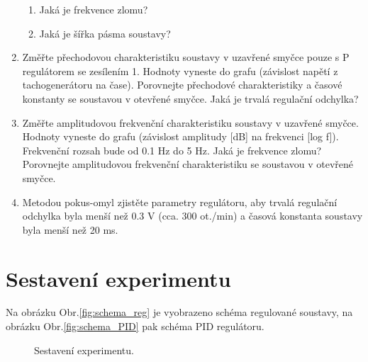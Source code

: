 \begin{enumerate}
\begin{enumerate}
	\item Jaká je frekvence zlomu?
	\item Jaká je šířka pásma soustavy?
\end{enumerate}
\item Změřte přechodovou charakteristiku soustavy v uzavřené smyčce pouze s P regulátorem se zesílením 1. Hodnoty vyneste do grafu (závislost napětí z tachogenerátoru na čase). Porovnejte přechodové charakteristiky a časové konstanty se soustavou v otevřené smyčce. Jaká je trvalá regulační odchylka?
\item Změřte amplitudovou frekvenční charakteristiku soustavy v uzavřené smyčce. Hodnoty vyneste do grafu (závislost amplitudy [dB] na frekvenci [log f]). Frekvenční rozsah bude od 0.1 Hz do 5 Hz. Jaká je frekvence zlomu? Porovnejte amplitudovou frekvenční charakteristiku se soustavou v otevřené smyčce.
\item Metodou pokus-omyl zjistěte parametry regulátoru, aby trvalá regulační odchylka byla menší než 0.3 V (cca. 300 ot./min) a časová konstanta soustavy byla menší než 20 ms.
\end{enumerate}


\newpage
\section{Sestavení experimentu}

Na obrázku Obr.\ref{fig:schema_reg} je vyobrazeno schéma regulované soustavy, na obrázku Obr.\ref{fig:schema_PID} pak schéma PID regulátoru.

\begin{figure}[H]
  \centering
  \hfill
  \caption{Sestavení experimentu.}
\end{figure}


